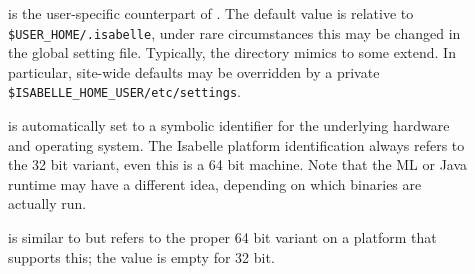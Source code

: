 \begin{isabellebody}
\begin{isamarkuptext}
\begin{description}
  \item[\hypertarget{setting.ISABELLE-HOME-USER}{\hyperlink{setting.ISABELLE-HOME-USER}{\mbox{}}}] is the user-specific
  counterpart of \hyperlink{setting.ISABELLE-HOME}{\mbox{}}. The default value is
  relative to \verb|$USER_HOME/.isabelle|, under rare
  circumstances this may be changed in the global setting file.
  Typically, the \hyperlink{setting.ISABELLE-HOME-USER}{\mbox{}} directory mimics
  \hyperlink{setting.ISABELLE-HOME}{\mbox{}} to some extend. In particular, site-wide
  defaults may be overridden by a private \verb|$ISABELLE_HOME_USER/etc/settings|.
  
  \item[\hypertarget{setting.ISABELLE-PLATFORM}{\hyperlink{setting.ISABELLE-PLATFORM}{\mbox{}}}] is automatically
  set to a symbolic identifier for the underlying hardware and
  operating system.  The Isabelle platform identification always
  refers to the 32 bit variant, even this is a 64 bit machine.  Note
  that the ML or Java runtime may have a different idea, depending on
  which binaries are actually run.

  \item[\hypertarget{setting.ISABELLE-PLATFORM64}{\hyperlink{setting.ISABELLE-PLATFORM64}{\mbox{}}}] is similar to
  \hyperlink{setting.ISABELLE-PLATFORM}{\mbox{}} but refers to the proper 64 bit variant
  on a platform that supports this; the value is empty for 32 bit.


\end{description}
\end{isamarkuptext}
\end{isabellebody}
